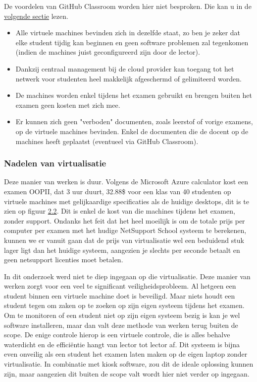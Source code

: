De voordelen van GitHub Classroom worden hier niet besproken. Die kan u in de \hyperref[sec:GHC]{volgende sectie} lezen.
\begin{itemize}
 \item Alle virtuele machines bevinden zich in dezelfde staat, zo ben je zeker dat elke student tijdig kan beginnen en geen software problemen zal tegenkomen (indien de machines juist geconfigureerd zijn door de lector). 
 \item Dankzij centraal management bij de cloud provider kan toegang tot het netwerk voor studenten heel makkelijk afgeschermd of gelimiteerd worden.
 \item  De machines worden enkel tijdens het examen gebruikt en brengen buiten het examen geen kosten met zich mee. 
 \item Er kunnen zich geen "verboden" documenten, zoals leerstof of vorige examens, op de virtuele machines bevinden. Enkel de documenten die de docent op de machines heeft geplaatst (eventueel via GitHub Classroom).
\end{itemize}

\subsubsection{Nadelen van virtualisatie}



	 Deze manier van werken is duur. Volgens de Microsoft Azure calculator kost een examen OOPII, dat 3 uur duurt, 32.88\$ voor een klas van 40 studenten op virtuele machines met gelijkaardige specificaties als de huidige desktops, dit is te zien op figuur \hyperref[fig:Calculator1]{2.2}. Dit is enkel de kost van die machines tijdens het examen, zonder support. Ondanks het feit dat het heel moeilijk is om de totale prijs per computer per examen met het hudige NetSupport School systeem te berekenen, kunnen we er vanuit gaan dat de prijs van virtualisatie wel een beduidend stuk lager ligt dan het huidige systeem, aangezien je slechts per seconde betaalt en geen netsupport licenties moet betalen. 
	
	In dit onderzoek werd niet te diep ingegaan op die virtualisatie. Deze manier van werken zorgt voor een veel te significant veiligheidsprobleem. Al hetgeen een student binnen een virtuele machine doet is beveiligd. Maar niets houdt een student tegen om zaken op te zoeken op zijn eigen systeem tijdens het examen. Om te monitoren of een student niet op zijn eigen systeem bezig is kan je wel software installeren, maar dan valt deze methode van werken terug buiten de scope. De enige controle hierop is een virtuele controle, die is alles behalve waterdicht en de effici\"entie hangt van lector tot lector af. Dit systeem is bijna even onveilig als een student het examen laten maken op de eigen laptop zonder virtualisatie. In combinatie met kiosk software, zou dit de ideale oplossing kunnen zijn, maar aangezien dit buiten de scope valt wordt hier niet verder op ingegaan.
	

